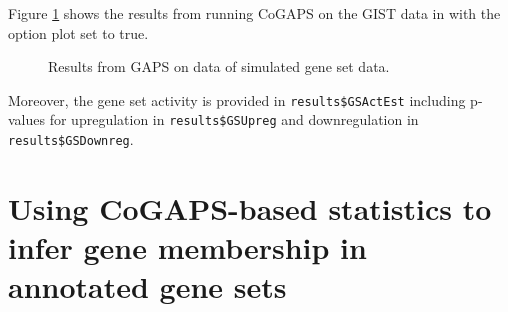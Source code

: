 \documentclass{report}
\begin{document}
Figure \ref{fig:GS} shows the results from running CoGAPS on the GIST data in \cite{Ochs2009} with the option plot set to true.
\begin{figure}[ht]
\begin{center}
\end{center}
\caption{Results from GAPS on data of simulated gene set data.}
\label{fig:GS}
\end{figure}

\par Moreover, the gene set activity is provided in \texttt{results\$GSActEst} including p-values for upregulation in \texttt{results\$GSUpreg} and downregulation in \texttt{results\$GSDownreg}.

\section{Using CoGAPS-based statistics to infer gene membership in annotated gene sets}
\end{document}
